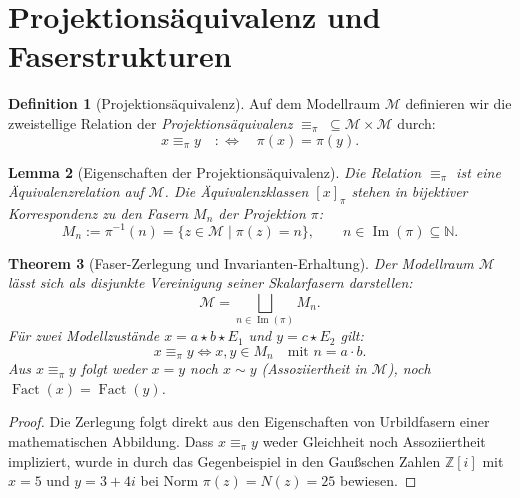 \documentclass[11pt,a4paper,reqno]{amsart}
\newtheorem{theorem}{Theorem}[section]
\newtheorem{lemma}[theorem]{Lemma}
\theoremstyle{definition}
\newtheorem{definition}[theorem]{Definition}
\theoremstyle{remark}
\newcommand{\M}{\mathcal{M}}
\newcommand{\N}{\mathbb{N}}
\newcommand{\Z}{\mathbb{Z}}
\newcommand{\Fact}{\operatorname{Fact}}
\begin{document}
\section{Projektionsäquivalenz und Faserstrukturen}

\begin{definition}[Projektionsäquivalenz]
Auf dem Modellraum $\M$ definieren wir die zweistellige Relation der \emph{Projektionsäquivalenz} $\equiv_\pi \;\subseteq \M \times \M$ durch:
\begin{equation}
x \equiv_\pi y \quad :\Longleftrightarrow \quad \pi(x) = \pi(y).
\end{equation}
\end{definition}

\begin{lemma}[Eigenschaften der Projektionsäquivalenz]
Die Relation $\equiv_\pi$ ist eine Äquivalenzrelation auf $\M$. Die Äquivalenzklassen $[x]_\pi$ stehen in bijektiver Korrespondenz zu den Fasern $M_n$ der Projektion $\pi$:
\begin{equation}
M_n := \pi^{-1}(n) = \{ z \in \M \mid \pi(z) = n \}, \qquad n \in \operatorname{Im}(\pi) \subseteq \N.
\end{equation}
\end{lemma}

\begin{theorem}[Faser-Zerlegung und Invarianten-Erhaltung]
\label{thm:faser}
Der Modellraum $\M$ lässt sich als disjunkte Vereinigung seiner Skalarfasern darstellen:
\begin{equation}
\M = \bigsqcup_{n \in \operatorname{Im}(\pi)} M_n.
\end{equation}
Für zwei Modellzustände $x = a \star b \star E_1$ und $y = c \star E_2$ gilt:
\begin{equation}
x \equiv_\pi y \iff x,y \in M_n \quad \text{mit } n = a \cdot b.
\end{equation}
Aus $x \equiv_\pi y$ folgt weder $x = y$ noch $x \sim y$ (Assoziiertheit in $\M$), noch $\Fact(x) = \Fact(y)$.
\end{theorem}

\begin{proof}
Die Zerlegung folgt direkt aus den Eigenschaften von Urbildfasern einer mathematischen Abbildung. Dass $x \equiv_\pi y$ weder Gleichheit noch Assoziiertheit impliziert, wurde in \cite{Hoffbauer2026} durch das Gegenbeispiel in den Gaußschen Zahlen $\Z[i]$ mit $x=5$ und $y=3+4i$ bei Norm $\pi(z)=N(z)=25$ bewiesen.
\end{proof}
\end{document}
